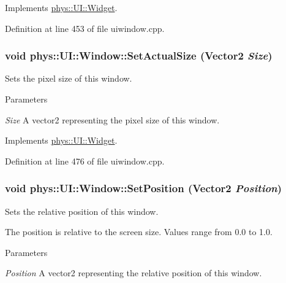 Implements \hyperlink{classphys_1_1UI_1_1Widget_ac8f70c390e7724e57fc99e51d8004a9b}{phys::UI::Widget}.



Definition at line 453 of file uiwindow.cpp.

\hypertarget{classphys_1_1UI_1_1Window_ad297fc3485097a2bce7120f9f22d6c19}{
\subsubsection[{SetActualSize}]{\setlength{\rightskip}{0pt plus 5cm}void phys::UI::Window::SetActualSize ({\bf Vector2} {\em Size})}}
\label{d4/d86/classphys_1_1UI_1_1Window_ad297fc3485097a2bce7120f9f22d6c19}


Sets the pixel size of this window. 


\begin{DoxyParams}{Parameters}
\item[{\em Size}]A vector2 representing the pixel size of this window. \end{DoxyParams}


Implements \hyperlink{classphys_1_1UI_1_1Widget_a8ceb54fd067847844b314dedd8e529f8}{phys::UI::Widget}.



Definition at line 476 of file uiwindow.cpp.

\hypertarget{classphys_1_1UI_1_1Window_ac49d7c2a12293cc80b289c653b55680d}{
\subsubsection[{SetPosition}]{\setlength{\rightskip}{0pt plus 5cm}void phys::UI::Window::SetPosition ({\bf Vector2} {\em Position})}}
\label{d4/d86/classphys_1_1UI_1_1Window_ac49d7c2a12293cc80b289c653b55680d}


Sets the relative position of this window. 

The position is relative to the screen size. Values range from 0.0 to 1.0. 
\begin{DoxyParams}{Parameters}
\item[{\em Position}]A vector2 representing the relative position of this window. \end{DoxyParams}


